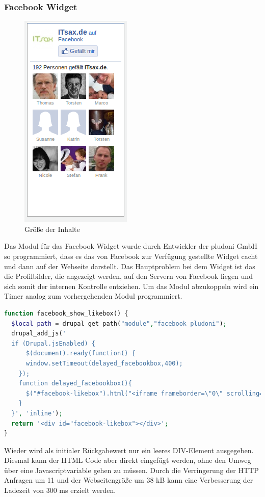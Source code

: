 
\subsubsection{Facebook Widget}
\begin{figure}[htbp]
  \centering
  \includegraphics[scale=0.5]{material/facebook_widget.png}
  \caption{Größe der Inhalte}
  \label{fig:startbyte}
\end{figure} Das Modul für das Facebook Widget wurde durch Entwickler der pludoni GmbH so programmiert, dass es das von Facebook zur Verfügung gestellte Widget cacht und dann auf der Webseite darstellt. Das Hauptproblem bei dem Widget ist  das die Profilbilder, die angezeigt werden, auf den Servern von Facebook liegen und sich somit der internen Kontrolle entziehen. Um das Modul abzukoppeln wird ein Timer analog zum vorhergehenden Modul programmiert. 
\begin{lstlisting}[language=php,label=Facebook Widget,caption=Facebook Widget]
function facebook_show_likebox() {
  $local_path = drupal_get_path("module","facebook_pludoni");
  drupal_add_js('
  if (Drupal.jsEnabled) {
      $(document).ready(function() {
      window.setTimeout(delayed_facebookbox,400);
    });
    function delayed_facebookbox(){
      $("#facebook-likebox").html("<iframe frameborder=\"0\" scrolling=\"no\" src=\"/'.$local_path.'/caching/likebox_cache.html\" id=\"fbooklikebox\"></iframe>");
    }
  }', 'inline');
  return '<div id="facebook-likebox"></div>';
}
\end{lstlisting}
Wieder wird als initialer Rückgabewert nur ein leeres DIV-Element ausgegeben. Diesmal kann der HTML Code aber direkt eingefügt werden, ohne den Umweg über eine Javascriptvariable gehen zu müssen. Durch die Verringerung der HTTP Anfragen um 11 und der Webseitengröße um 38 kB kann eine Verbesserung der Ladezeit von 300 ms erzielt werden. 


